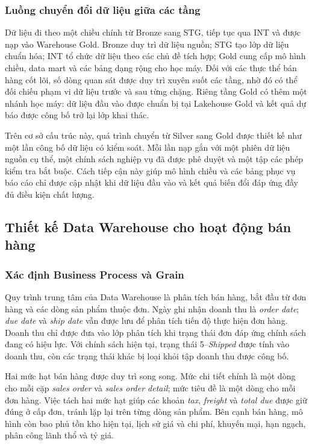 \subsubsection{Luồng chuyển đổi dữ liệu giữa các tầng}

Dữ liệu đi theo một chiều chính từ Bronze sang STG, tiếp tục qua INT và được nạp vào Warehouse Gold. Bronze duy trì dữ liệu nguồn; STG tạo lớp dữ liệu chuẩn hóa; INT tổ chức dữ liệu theo các chủ đề tích hợp; Gold cung cấp mô hình chiều, data mart và các bảng dạng rộng cho học máy. Đối với các thực thể bán hàng cốt lõi, số dòng quan sát được duy trì xuyên suốt các tầng, nhờ đó có thể đối chiếu phạm vi dữ liệu trước và sau từng chặng. Riêng tầng Gold có thêm một nhánh học máy: dữ liệu đầu vào được chuẩn bị tại Lakehouse Gold và kết quả dự báo được công bố trở lại lớp khai thác.

Trên cơ sở cấu trúc này, quá trình chuyển từ Silver sang Gold được thiết kế như một lần công bố dữ liệu có kiểm soát. Mỗi lần nạp gắn với một phiên dữ liệu nguồn cụ thể, một chính sách nghiệp vụ đã được phê duyệt và một tập các phép kiểm tra bắt buộc. Cách tiếp cận này giúp mô hình chiều và các bảng phục vụ báo cáo chỉ được cập nhật khi dữ liệu đầu vào và kết quả biến đổi đáp ứng đầy đủ điều kiện chất lượng.

\subsection{Thiết kế Data Warehouse cho hoạt động bán hàng}

\subsubsection{Xác định Business Process và Grain}

Quy trình trung tâm của Data Warehouse là phân tích bán hàng, bắt đầu từ đơn hàng và các dòng sản phẩm thuộc đơn. Ngày ghi nhận doanh thu là \textit{order date}; \textit{due date} và \textit{ship date} vẫn được lưu để phân tích tiến độ thực hiện đơn hàng. Doanh thu chỉ được đưa vào lớp phân tích khi trạng thái đơn đáp ứng chính sách đang có hiệu lực. Với chính sách hiện tại, trạng thái 5--\textit{Shipped} được tính vào doanh thu, còn các trạng thái khác bị loại khỏi tập doanh thu được công bố.

Hai mức hạt bán hàng được duy trì song song. Mức chi tiết chính là một dòng cho mỗi cặp \textit{sales order} và \textit{sales order detail}; mức tiêu đề là một dòng cho mỗi đơn hàng. Việc tách hai mức hạt giúp các khoản \textit{tax}, \textit{freight} và \textit{total due} được giữ đúng ở cấp đơn, tránh lặp lại trên từng dòng sản phẩm. Bên cạnh bán hàng, mô hình còn bao phủ tồn kho hiện tại, lịch sử giá và chi phí, khuyến mại, hạn ngạch, phân công lãnh thổ và tỷ giá.

